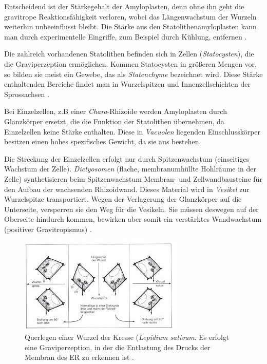 \documentclass[
11pt, 
ngerman,
listof=totocnumbered,
oneside,
bibliography=totocnumbered,
abstracton
]{scrreprt}
\begin{document}
Entscheidend ist der Stärkegehalt der Amyloplasten, denn ohne ihn geht die gravitrope Reaktionsfähigkeit verloren, wobei das Längenwachstum der Wurzeln weiterhin unbeeinflusst bleibt.
Die Stärke aus den Statolithenamyloplasten kann man durch experimentelle Eingriffe, zum Beispiel durch Kühlung, entfernen \parencite[452]{Strasburger}.

Die zahlreich vorhandenen Statolithen befinden sich in Zellen (\emph{Statocysten}), die die Graviperzeption ermöglichen. Kommen Statocysten in größeren Mengen vor, so bilden sie meist ein Gewebe, das als \emph{Statenchyme} bezeichnet wird. Diese Stärke enthaltenden Bereiche findet man in Wurzelspitzen und Innenzellschichten der Sprossachsen \parencite[501--502]{Nultsch}.  


Bei Einzelzellen, z.B einer \emph{Chara}-Rhizoide werden Amyloplasten durch {\glqq Glanzkörper\grqq} ersetzt, die die Funktion der Statolithen übernehmen, da Einzelzellen keine Stärke enthalten. Diese in \emph{Vacuolen} liegenden Einschlusskörper besitzen einen hohes spezifisches Gewicht, da sie aus  bestehen.

Die Streckung der Einzelzellen erfolgt nur durch Spitzenwachstum (einseitiges Wachstum der Zelle).
\emph{Dictyosomen} (flache, membranumhüllte Hohlräume in der Zelle) synthetisieren beim Spitzenwachstum Membran- und Zellwandbausteine für den Aufbau der wachsenden Rhizoidwand. Dieses Material wird in \emph{Vesikel} zur Wurzelspitze transportiert.
Wegen der Verlagerung der {\glqq Glanzkörper\grqq} auf die Unterseite, versperren sie den Weg für die Vesikeln. Sie müssen deswegen auf der Oberseite hindurch kommen, bewirken aber somit ein verstärktes Wandwachstum (positiver Gravitropismus) \parencite[453--454]{Strasburger}.
  
 \begin{figure}[H]
 	\centering 
 	\includegraphics[width = 0.9\linewidth]{images/Graviperzeption.jpeg}
 	\caption{Querlegen einer Wurzel der Kresse (\emph{Lepidium sativum}. Es erfolgt eine Graviperzeption, in der die Entlastung des Drucks der Membran des ER zu erkennen ist \parencite[533]{Luettge}. \label{Graviperzeption}}
 \end{figure} 
 
\end{document}
